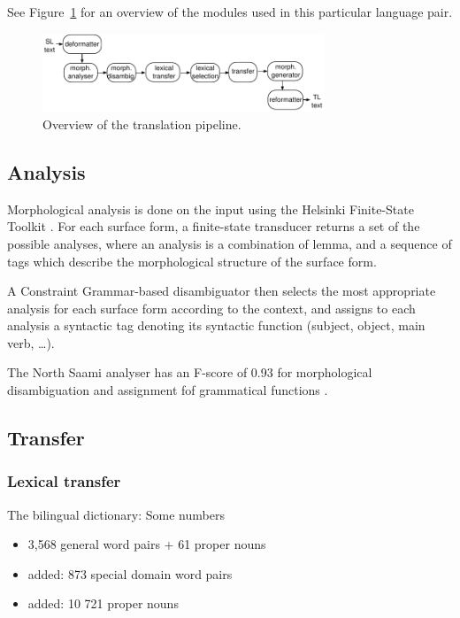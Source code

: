 \documentclass[a4paper,11pt,twocolumn]{article}
\begin{document}
See Figure~\ref{fig:pipeline} for an overview of the modules used
in this particular language pair.

\begin{figure}
 \centering
 \includegraphics[width=0.75\textwidth]{architecture-overview.pdf}
 \caption{Overview of the translation pipeline.}
 \label{fig:pipeline}
\end{figure}

\subsection{Analysis}

Morphological analysis is done on the input using the Helsinki Finite-State
Toolkit \cite{linden2011}. For each surface form, a finite-state transducer
returns a set of the possible analyses, where an analysis is a combination
of lemma, and a sequence of tags which describe the morphological structure
of the surface form.

A Constraint Grammar-based disambiguator then selects the most appropriate 
analysis for each surface form according to the context, and assigns to each 
analysis a syntactic tag denoting its syntactic function (subject, object, 
main verb, \ldots).

The North Saami analyser has an F-score of 0.93 for morphological disambiguation
and assignment fof grammatical functions \cite{AntonsenEtalReusing2010}.

\subsection{Transfer}

\subsubsection{Lexical transfer}

The bilingual dictionary: Some numbers 

\begin{itemize}
\item 3,568 general word pairs + 61 proper nouns
\item added: 873 special domain word pairs 
\item added: 10 721 proper nouns
\end{itemize}
\end{document}

